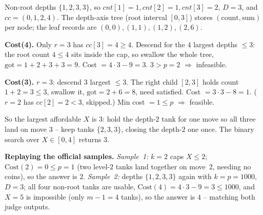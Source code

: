 \begin{tracebox}[Synchronise tanks of depth profile 1,2,3,3 with k=4 and p=2]
Non-root depths \(\{1,2,3,3\}\), so \(\mathit{cnt}[1]{=}1,\mathit{cnt}[2]{=}1,
\mathit{cnt}[3]{=}2\), \(D{=}3\), and \(\mathit{cc}=(0,1,2,4)\). The depth-axis tree
(root interval \([0,3]\)) stores \((\text{count},\text{sum})\) per node; the leaf
records are \((0,0),(1,1),(1,2),(2,6)\).

\textbf{Cost(4).} Only \(r{=}3\) has \(\mathit{cc}[3]{=}4\ge4\). Descend for the \(4\)
largest depths \(\le3\): the root count \(4\le4\) sits inside the cap, so swallow the
whole tree, \(\text{got}=1{+}2{+}3{+}3=9\). Cost \(=4\cdot3-9=3\). \(3>p{=}2\) \(\Rightarrow\) infeasible.

\textbf{Cost(3).} \(r{=}3\): descend \(3\) largest \(\le3\). The right child \([2,3]\)
holds count \(1{+}2=3\le3\), swallow it, \(\text{got}=2+6=8\), need satisfied. Cost
\(=3\cdot3-8=1\). (\(r{=}2\) has \(\mathit{cc}[2]{=}2<3\), skipped.) Min cost \(=1\le p\) \(\Rightarrow\) feasible.

So the largest affordable \(X\) is \(3\): hold the depth-\(2\) tank for one move so all
three land on move \(3\) -- keep tanks \(\{2,3,3\}\), closing the depth-\(2\) one once.
The binary search over \(X\in[0,4]\) returns \(3\).
\end{tracebox}

\noindent\textbf{Replaying the official samples.} \emph{Sample~1:} \(k=2\) caps
\(X\le2\); \(\text{Cost}(2)=0\le p=1\) (two level-\(2\) tanks land together on move~2,
needing no coins), so the answer is \(2\). \emph{Sample~2:} depths
\(\{1,2,3,3\}\) again with \(k=p=1000\), \(D=3\); all four non-root tanks are usable,
\(\text{Cost}(4)=4\cdot3-9=3\le1000\), and \(X=5\) is impossible (only \(m-1=4\) tanks),
so the answer is \(4\) -- matching both judge outputs.

